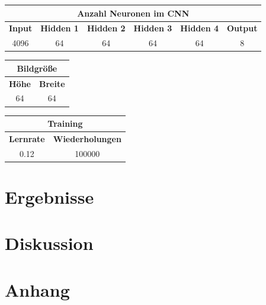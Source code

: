 \documentclass[paper=A4,pagesize=auto,12pt,headinclude=true,footinclude=true,BCOR=0mm,DIV=calc]{scrartcl}
\renewcommand{\listoffigures}{\begingroup
	\tocsection
	\tocfile{\listfigurename}{lof}
	\endgroup}
\renewcommand{\listoftables}{\begingroup
	\tocsection
	\tocfile{\listtablename}{lot}
	\endgroup}
\begin{document}
\begin{center}
	\begin{tabular}{|c|c|c|c|c|c|}
		\hline
		\multicolumn{6}{|c|}{\textbf{Anzahl Neuronen im CNN}}\\ \hline \hline
		\textbf{Input} & \textbf{Hidden 1} & \textbf{Hidden 2} & \textbf{Hidden 3} & \textbf{Hidden 4} & \textbf{Output}\\ \hline
		4096 & 64 & 64 & 64 & 64 & 8\\ \hline
	\end{tabular}
	\vspace{2em}
	\begin{tabular}{|c|c|}
		\hline
		\multicolumn{2}{|c|}{\textbf{Bildgröße}}\\ \hline \hline
		\textbf{Höhe} & \textbf{Breite}\\ \hline
		64 & 64\\ \hline
	\end{tabular}
	\vspace{2em}
	\begin{tabular}{|c|c|}
		\hline
		\multicolumn{2}{|c|}{\textbf{Training}}\\ \hline \hline
		\textbf{Lernrate} & \textbf{Wiederholungen}\\ \hline
		0.12 & 100000\\ \hline
	\end{tabular}
\end{center}



\section{Ergebnisse}



\section{Diskussion}


\printbibliography[heading=bibnumbered]


\listoffigures
\listoftables

\section{Anhang}
\end{document}
